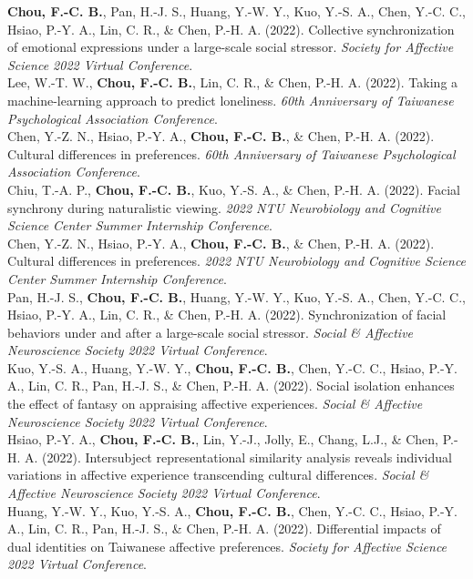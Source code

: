 \documentclass[a4paper,12pt]{article}
\newcommand{\itemspace}{7pt} %
\begin{document}
\noindent \textbf{Chou, F.-C. B.}, Pan, H.-J. S., Huang, Y.-W. Y., Kuo, Y.-S. A., Chen, Y.-C. C., Hsiao, P.-Y. A., Lin, C. R., \& Chen, P.-H. A. (2022). Collective synchronization of emotional expressions under a large-scale social stressor. \textit{Society for Affective Science 2022 Virtual Conference}.\\[\itemspace]
\noindent Lee, W.-T. W., \textbf{Chou, F.-C. B.}, Lin, C. R., \& Chen, P.-H. A. (2022). Taking a machine-learning approach to predict loneliness. \textit{60th Anniversary of Taiwanese Psychological Association Conference}.\\[\itemspace]
\noindent Chen, Y.-Z. N., Hsiao, P.-Y. A., \textbf{Chou, F.-C. B.}, \& Chen, P.-H. A. (2022). Cultural differences in preferences. \textit{60th Anniversary of Taiwanese Psychological Association Conference}.\\[\itemspace]
\noindent Chiu, T.-A. P., \textbf{Chou, F.-C. B.}, Kuo, Y.-S. A., \& Chen, P.-H. A. (2022). Facial synchrony during naturalistic viewing. \textit{2022 NTU Neurobiology and Cognitive Science Center Summer Internship Conference}.\\[\itemspace]
\noindent Chen, Y.-Z. N., Hsiao, P.-Y. A., \textbf{Chou, F.-C. B.}, \& Chen, P.-H. A. (2022). Cultural differences in preferences. \textit{2022 NTU Neurobiology and Cognitive Science Center Summer Internship Conference}.\\[\itemspace]
\noindent Pan, H.-J. S., \textbf{Chou, F.-C. B.}, Huang, Y.-W. Y., Kuo, Y.-S. A., Chen, Y.-C. C., Hsiao, P.-Y. A., Lin, C. R., \& Chen, P.-H. A. (2022). Synchronization of facial behaviors under and after a large-scale social stressor. \textit{Social \& Affective Neuroscience Society 2022 Virtual Conference}.\\[\itemspace]
\noindent Kuo, Y.-S. A., Huang, Y.-W. Y., \textbf{Chou, F.-C. B.}, Chen, Y.-C. C., Hsiao, P.-Y. A., Lin, C. R., Pan, H.-J. S., \& Chen, P.-H. A. (2022). Social isolation enhances the effect of fantasy on appraising affective experiences. \textit{Social \& Affective Neuroscience Society 2022 Virtual Conference}.\\[\itemspace]
\noindent Hsiao, P.-Y. A., \textbf{Chou, F.-C. B.}, Lin, Y.-J., Jolly, E., Chang, L.J., \& Chen, P.-H. A. (2022). Intersubject representational similarity analysis reveals individual variations in affective experience transcending cultural differences. \textit{Social \& Affective Neuroscience Society 2022 Virtual Conference}.\\[\itemspace]
\noindent Huang, Y.-W. Y., Kuo, Y.-S. A., \textbf{Chou, F.-C. B.}, Chen, Y.-C. C., Hsiao, P.-Y. A., Lin, C. R., Pan, H.-J. S., \& Chen, P.-H. A. (2022). Differential impacts of dual identities on Taiwanese affective preferences. \textit{Society for Affective Science 2022 Virtual Conference}.\\[\itemspace]
\end{document}
